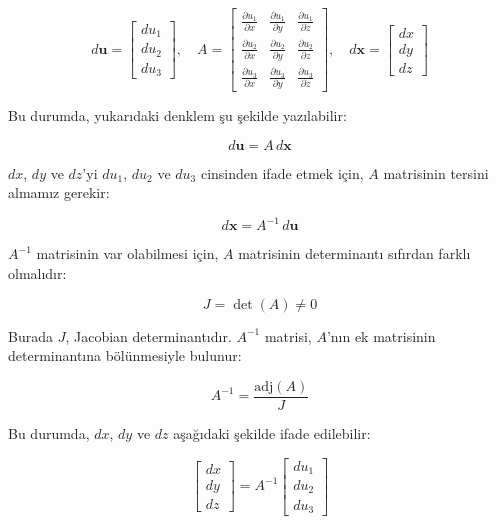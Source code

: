 \documentclass[11pt,letterpaper,twocolumn]{fenbil}
\begin{document}
\begin{equation}
d\mathbf{u} = \begin{bmatrix} du_1 \\ du_2 \\ du_3 \end{bmatrix}, \quad
A = \begin{bmatrix}
\frac{\partial u_1}{\partial x} & \frac{\partial u_1}{\partial y} & \frac{\partial u_1}{\partial z} \\
\frac{\partial u_2}{\partial x} & \frac{\partial u_2}{\partial y} & \frac{\partial u_2}{\partial z} \\
\frac{\partial u_3}{\partial x} & \frac{\partial u_3}{\partial y} & \frac{\partial u_3}{\partial z}
\end{bmatrix}, \quad
d\mathbf{x} = \begin{bmatrix} dx \\ dy \\ dz \end{bmatrix}
\end{equation}

Bu durumda, yukarıdaki denklem şu şekilde yazılabilir:

\begin{equation}
d\mathbf{u} = A \, d\mathbf{x}
\end{equation}

$dx$, $dy$ ve $dz$'yi $du_1$, $du_2$ ve $du_3$ cinsinden ifade etmek için, $A$ matrisinin tersini almamız gerekir:

\begin{equation}
d\mathbf{x} = A^{-1} \, d\mathbf{u}
\end{equation}

$A^{-1}$ matrisinin var olabilmesi için, $A$ matrisinin determinantı sıfırdan farklı olmalıdır:

\begin{equation}
J = \det(A) \neq 0
\end{equation}

Burada $J$, Jacobian determinantıdır. $A^{-1}$ matrisi, $A$'nın ek matrisinin determinantına bölünmesiyle bulunur:

\begin{equation}
A^{-1} = \frac{\text{adj}(A)}{J}
\end{equation}

Bu durumda, $dx$, $dy$ ve $dz$ aşağıdaki şekilde ifade edilebilir:

\begin{equation}
\begin{bmatrix} dx \\ dy \\ dz \end{bmatrix} = A^{-1} \begin{bmatrix} du_1 \\ du_2 \\ du_3 \end{bmatrix}
\end{equation}
\end{document}
